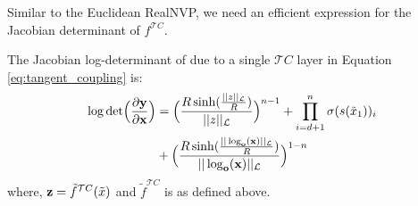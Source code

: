 Similar to the Euclidean RealNVP, we need an efficient expression for the Jacobian determinant of $f^{\mathcal{T}C}$.
\begin{prop}
The Jacobian log-determinant of due to a single $\mathcal{T}C$ layer in Equation \eqref{eq:tangent_coupling} is:
\begin{align*}
\cut{
    \textnormal{det}\Big (\frac{\partial \textbf{y}}{\partial \textbf{x}}\Big) =  \textnormal{det}\Big (\frac{\partial \textnormal{exp}_{\textbf{o}}(z)}{\partial z}\Big) \cdot \textnormal{det}\Big (\frac{\partial f(\tilde{x})}{\partial \tilde{x}}\Big) \cdot  \textnormal{det}\Big (\frac{\partial \log_{\textbf{o}}(\textbf{x})}{\partial \textbf{x}}\Big)
    }
     \log \textnormal{det}\Big (\frac{\partial \textbf{y}}{\partial \textbf{x}}\Big) &= \Big(\frac{R\sinh(\frac{||z||_{\mathcal{L}}}{R})}{||z||_{\mathcal{L}}}\Big)^{n-1} + \prod_{i=d+1}^n\sigma(s(\tilde{x}_1))_i \\
     & + \Big(\frac{R\sinh(\frac{||\log_{\textbf{o}}(\textbf{x})||_{\mathcal{L}}}{R})}{||\log_{\textbf{o}}(\textbf{x})||_{\mathcal{L}}}\Big)^{1-n}
\end{align*}
where, $ \mathbf{z} =  \tilde{f}^{\mathcal{T}C}(\tilde{x})$ and $\tilde{f}^{\mathcal{T}C}$ is as defined above.
\end{prop}
